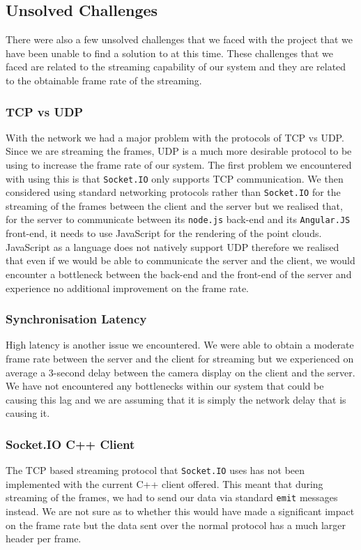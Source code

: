 \documentclass{article}
\begin{document}
\subsection{Unsolved Challenges}
There were also a few unsolved challenges that we faced with the project that we have been unable to find a solution to at this time. These challenges that we faced are related to the streaming capability of our system and they are related to the obtainable frame rate of the streaming.
\subsubsection{TCP vs UDP}
With the network we had a major problem with the protocols of TCP vs UDP. Since we are streaming the frames, UDP is a much more desirable protocol to be using to increase the frame rate of our system. The first problem we encountered with using this is that \texttt{Socket.IO} \cite{socketio} only supports TCP communication. We then considered using standard networking protocols rather than \texttt{Socket.IO} \cite{socketio} for the streaming of the frames between the client and the server but we realised that, for the server to communicate between its \texttt{node.js} \cite{node} back-end and its \texttt{Angular.JS} \cite{angular} front-end, it needs to use JavaScript for the rendering of the point clouds. JavaScript as a language does not natively support UDP therefore we realised that even if we would be able to communicate the server and the client, we would encounter a bottleneck between the back-end and the front-end of the server and experience no additional improvement on the frame rate.
\subsubsection{Synchronisation Latency}
High latency is another issue we encountered. We were able to obtain a moderate frame rate between the server and the client for streaming but we experienced on average a 3-second delay between the camera display on the client and the server. We have not encountered any bottlenecks within our system that could be causing this lag and we are assuming that it is simply the network delay that is causing it.
\subsubsection{Socket.IO C++ Client}
The TCP based streaming protocol that \texttt{Socket.IO} \cite{socketio} uses has not been implemented with the current C++ client offered. This meant that during streaming of the frames, we had to send our data via standard \texttt{emit} messages instead. We are not sure as to whether this would have made a significant impact on the frame rate but the data sent over the normal protocol has a much larger header per frame.
\end{document}
